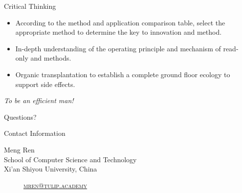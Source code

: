 \documentclass[
 size=14pt,
 paper=smartboard,  %
 mode=present, 		%
 display=slides, 	%
 style=tuliplab,  	%
 pauseslide,
 fleqn,leqno]{powerdot}{}
\begin{document}
\begin{slide}[toc=,bm=]{Critical Thinking}

\begin{itemize}
  \item According to the method and application comparison table,
  select the appropriate method to determine the key to innovation and method.
  \item In-depth understanding of the operating principle and mechanism of read-only and methods.
  \item Organic transplantation to establish a complete ground floor ecology to support side effects.
\end{itemize}

\begin{center}
\Large{\textit{To be an efficient man!}}
\end{center}

\end{slide}

%
\begin{slide}[toc=,bm=]{Questions?}
\begin{center}
\begin{figure}
\end{figure}
\end{center}
\end{slide}

\begin{wideslide}[toc=,bm=]{Contact Information}
\centering
{}
\twocolumn[
lcolwidth=0.35\linewidth,
rcolwidth=0.65\linewidth
]
{
}
{
Meng Ren\\
School of Computer Science and Technology\\
Xi'an Shiyou University, China
\begin{description}
 \item[\textcolor{orange}{\faEnvelope}] \href{mailto:mren@tulip.academy}
 {\textsc{\footnotesize{mren@tulip.academy}}}

\end{description}
}
\end{wideslide}
\end{document}
